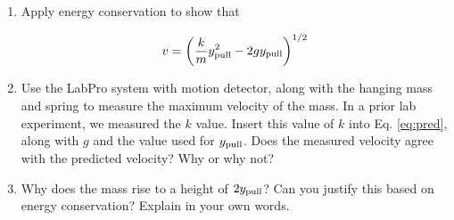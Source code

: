 \documentclass{article}
\begin{document}
\begin{enumerate}
\item 
Apply energy conservation to show that

\begin{equation}
v = \left( \frac{k}{m} y_{\rm pull}^2 - 2 g y_{\rm pull} \right)^{1/2} \label{eq:pred}
\end{equation}

\vspace{2cm}
\item
Use the LabPro system with motion detector, along with the hanging mass and spring to measure the maximum velocity of the mass.  In a prior lab experiment, we measured the $k$ value.  Insert this value of $k$ into Eq. \ref{eq:pred}, along with $g$ and the value used for $y_{\rm pull}$.  Does the measured velocity agree with the predicted velocity?  Why or why not? \\ \vspace{2cm}
\item
Why does the mass rise to a height of $2y_{\rm pull}$?  Can you justify this based on energy conservation?  Explain in your own words.
\end{enumerate}
\end{document}
